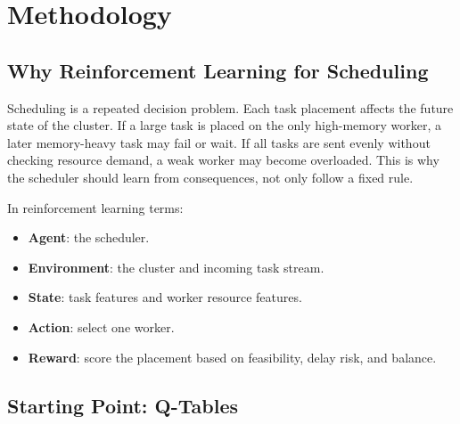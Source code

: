 %
%
%

\chapter{Methodology}
\label{section:methodology}



\section{Why Reinforcement Learning for Scheduling}

Scheduling is a repeated decision problem. Each task placement affects the future state of the cluster. If a large task is placed on the only high-memory worker, a later memory-heavy task may fail or wait. If all tasks are sent evenly without checking resource demand, a weak worker may become overloaded. This is why the scheduler should learn from consequences, not only follow a fixed rule.

In reinforcement learning terms:

\begin{itemize}
    \item \textbf{Agent}: the scheduler.
    \item \textbf{Environment}: the cluster and incoming task stream.
    \item \textbf{State}: task features and worker resource features.
    \item \textbf{Action}: select one worker.
    \item \textbf{Reward}: score the placement based on feasibility, delay risk, and balance.
\end{itemize}

\section{Starting Point: Q-Tables}

